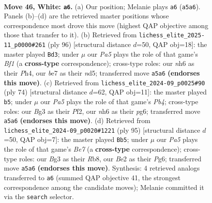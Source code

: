 \documentclass[11pt]{article}
\begin{document}
\clearpage

\begin{figure}[p]\centering
\begin{subfigure}{0.46\textwidth}\centering
\resizebox{\linewidth}{!}{%
\newchessgame
\chessboard[
  setfen={7r/p3b1kp/7n/P2r4/8/1Pp3BP/R1P1B1PK/1R6 w - - 7 46},
  showmover=false,
  pgfstyle=straightmove, color=movearrow, markmove={a5-a6}
]}
\caption{}
\end{subfigure}\hfill
\begin{subfigure}{0.46\textwidth}\centering
\resizebox{\linewidth}{!}{%
\newchessgame
\chessboard[
  setfen={8/5pk1/3p3p/3n4/3p3P/PR3PP1/2P3K1/r4B2 w - - 2 49},
  showmover=false,
  pgfstyle=straightmove, color=movearrow, markmove={f1-d3}
]}
\caption{}
\end{subfigure}
\\[4pt]
\begin{subfigure}{0.46\textwidth}\centering
\resizebox{\linewidth}{!}{%
\newchessgame
\chessboard[
  setfen={5b2/5k1p/3p2p1/3Pp3/rP6/4B2P/5PP1/1R4K1 w - - 1 38},
  showmover=false,
  pgfstyle=straightmove, color=movearrow, markmove={b4-b5}
]}
\caption{}
\end{subfigure}\hfill
\begin{subfigure}{0.46\textwidth}\centering
\resizebox{\linewidth}{!}{%
\newchessgame
\chessboard[
  setfen={1r4k1/r4p1p/4p1pP/4P1P1/p3R3/B7/4b1PK/2R5 b - - 18 48},
  showmover=false,
  pgfstyle=straightmove, color=movearrow, markmove={e2-b5}
]}
\caption{}
\end{subfigure}
\caption{\textbf{Move 46, White: \texttt{a6}.} (a) Our position; Melanie plays \texttt{a6} (\texttt{a5a6}). Panels (b)--(d) are the retrieved master positions whose correspondence most drove this move (highest QAP objective among those that transfer to it). (b) Retrieved from \texttt{lichess\_elite\_2025-11\_p0000\#261} (ply 96) [structural distance $d$=50, QAP obj=18]: the master played \texttt{Bd3}; under $\mu$ our \emph{Pa5} plays the role of that game's \emph{Bf1} (a \textbf{cross-type} correspondence); cross-type roles: our \emph{n}h6 as their \emph{P}h4, our \emph{b}e7 as their \emph{n}d5; transferred move \texttt{a5a6} \textbf{(endorses this move)}. (c) Retrieved from \texttt{lichess\_elite\_2024-09\_p0025\#90} (ply 74) [structural distance $d$=62, QAP obj=11]: the master played \texttt{b5}; under $\mu$ our \emph{Pa5} plays the role of that game's \emph{Pb4}; cross-type roles: our \emph{B}g3 as their \emph{P}f2, our \emph{n}h6 as their \emph{p}g6; transferred move \texttt{a5a6} \textbf{(endorses this move)}. (d) Retrieved from \texttt{lichess\_elite\_2024-09\_p0020\#1221} (ply 95) [structural distance $d$=50, QAP obj=7]: the master played \texttt{Bb5}; under $\mu$ our \emph{Pa5} plays the role of that game's \emph{Be7} (a \textbf{cross-type} correspondence); cross-type roles: our \emph{B}g3 as their \emph{R}b8, our \emph{B}e2 as their \emph{P}g6; transferred move \texttt{a5a6} \textbf{(endorses this move)}. Synthesis: 4 retrieved analogs transferred to \texttt{a6} (summed QAP objective 41, the strongest correspondence among the candidate moves); Melanie committed it via the \texttt{search} selector.}
\label{fig:thought-m90}
\end{figure}
\end{document}
